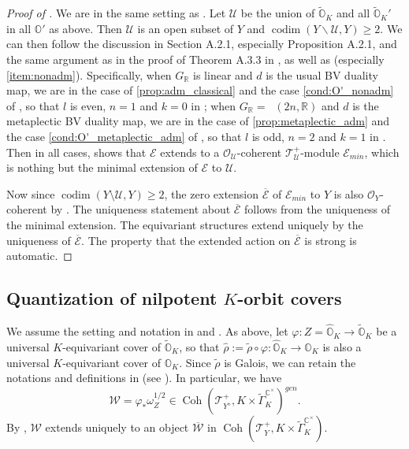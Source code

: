 \documentclass[11pt, a4paper]{amsart}
\newcommand{\C}{\mathbb{C}}
\newcommand{\orb}{\mathbb{O}}
\newcommand{\orbk}{\orb_{K}}
\newcommand{\torbk}{\widetilde{\orb}_{K}}
\newcommand{\horbk}{\widehat{\orb}_{K}}
\newcommand{\cE}{\mathcal{E}}
\newcommand{\cW}{\mathcal{W}}
\newcommand{\cU}{\mathcal{U}}
\newcommand{\tGamma}{\widetilde{\Gamma}}
\DeclareMathOperator{\codim}{codim}
\DeclareMathOperator{\Coh}{Coh}
\DeclareMathOperator{\Mp}{\widetilde{Sp}}
\newcommand{\smallhalf}{{\scriptscriptstyle 1/2}}
\newcommand{\R}{\mathbb{R}}
\newcommand{\TT}{\mathscr{T}}
\newcommand{\cm}{\C^\times}
\newcommand{\OO}{\mathcal{O}}
\newcommand{\GR}{G_\R}
\theoremstyle{definition}
\newtheorem{Rem}[Thm]{Remark}
\numberwithin{equation}{section}
\begin{document}
\begin{proof}[Proof of ]
	We are in the same setting as \cite[Appendix]{LosevYu}. Let $\cU$ be the union of $\torbk$ and all $\torbk'$ in all $\orb'$ as above. Then $\cU$ is an open subset of $Y$ and $\codim(Y \backslash \cU, Y) \geqslant 2$. We can then follow the discussion in Section A.2.1, especially Proposition A.2.1, and the same argument as in the proof of Theorem A.3.3 in \cite{LosevYu}, as well as  (especially \ref{item:nonadm}). Specifically, when $\GR$ is linear and $d$ is the usual BV duality map, we are in the case of \cref{prop:adm_classical} and the case \ref{cond:O'_nonadm} of , so that $l$ is even, $n=1$ and $k=0$ in \cite[Proposition A.2.1]{LosevYu}; when $\GR = \Mp(2n,\R)$ and $d$ is the metaplectic BV duality map, we are in the case of \cref{prop:metaplectic_adm} and the case \ref{cond:O'_metaplectic_adm} of , so that $l$ is odd, $n=2$ and $k=1$ in \cite[Proposition A.2.1]{LosevYu}. Then in all cases, \cite[Proposition A.2.1]{LosevYu} shows that $\cE$ extends to a $\OO_\cU$-coherent $\TT^+_{\cU}$-module $\cE_{min}$, which is nothing but the minimal extension of $\cE$ to $\cU$.

	Now since $\codim(Y \setminus \cU, Y) \geqslant 2$, the zero extension $\overline{\cE}$ of $\cE_{min}$ to $Y$ is also $\OO_Y$-coherent by \cite[Proposition 5.11.1]{EGA4}. The uniqueness statement about $\overline{\cE}$ follows from the uniqueness of the minimal extension. The equivariant structures extend uniquely by the uniqueness of $\overline{\cE}$. The property that the extended action on $\overline{\cE}$ is strong is automatic.
\end{proof}

\subsection{Quantization of nilpotent $K$-orbit covers} \label{subsec:quant_K_orb}

We assume the setting and notation in  and .
As above, let $\varphi: Z=\horbk \to \torbk$ be a universal $K$-equivariant cover of $\torbk$, so that $\hat{\rho}:=\tilde{\rho} \circ \varphi: \horbk \to \orbk$ is also a universal $K$-equivariant cover of $\orbk$. Since $\tilde{\rho}$ is Galois, we can retain the notations and definitions in  (see ). In particular, we have 
\[
	\cW = \varphi_* \omega_Z^{\smallhalf} \in \Coh(\TT^+_{Y^\diamond}, K \times \tGamma_K^{\cm})^{gen}.
\]
By , $\cW$ extends uniquely to an object $\overline{\cW}$ in $\Coh(\TT^+_Y, K \times \tGamma_K^{\cm})$.
\end{document}
